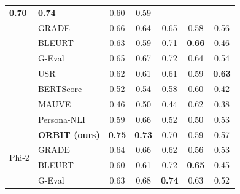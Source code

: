 \documentclass[11pt]{article}
\begin{document}
\begin{longtable}{llccccc}
\cellcolor{green!25}\textbf{0.70} &
\cellcolor{green!30}\textbf{0.74} &
\cellcolor{yellow!20}0.60 &
\cellcolor{yellow!25}0.59 \\
& GRADE &
\cellcolor{green!20}0.66 &
\cellcolor{green!15}0.64 &
\cellcolor{yellow!25}0.65 &
\cellcolor{yellow!20}0.58 &
\cellcolor{yellow!20}0.56 \\
& BLEURT &
\cellcolor{yellow!25}0.63 &
\cellcolor{yellow!25}0.59 &
\cellcolor{green!25}0.71 &
\cellcolor{green!15}\textbf{0.66} &
\cellcolor{red!10}0.46 \\
& G-Eval &
\cellcolor{green!15}0.65 &
\cellcolor{green!20}0.67 &
\cellcolor{green!25}0.72 &
\cellcolor{green!20}0.64 &
\cellcolor{yellow!20}0.54 \\
& USR &
\cellcolor{green!15}0.62 &
\cellcolor{green!15}0.61 &
\cellcolor{yellow!25}0.61 &
\cellcolor{yellow!20}0.59 &
\cellcolor{green!25}\textbf{0.63} \\
& BERTScore &
\cellcolor{red!15}0.52 &
\cellcolor{red!20}0.54 &
\cellcolor{yellow!20}0.58 &
\cellcolor{yellow!25}0.60 &
\cellcolor{red!20}0.42 \\
& MAUVE &
\cellcolor{red!30}0.46 &
\cellcolor{red!30}0.50 &
\cellcolor{red!30}0.44 &
\cellcolor{yellow!15}0.62 &
\cellcolor{red!30}0.38 \\
& Persona-NLI &
\cellcolor{yellow!20}0.59 &
\cellcolor{green!15}0.66 &
\cellcolor{red!20}0.52 &
\cellcolor{red!20}0.50 &
\cellcolor{yellow!25}0.53 \\
\midrule
\multirow{8}{*}{Phi-2} 
& \textbf{ORBIT (ours)} &
\cellcolor{green!35}\textbf{0.75} &
\cellcolor{green!30}\textbf{0.73} &
\cellcolor{green!25}0.70 &
\cellcolor{yellow!25}0.59 &
\cellcolor{yellow!30}0.57 \\

& GRADE &
\cellcolor{green!20}0.64 &
\cellcolor{green!20}0.66 &
\cellcolor{yellow!25}0.62 &
\cellcolor{yellow!20}0.56 &
\cellcolor{yellow!20}0.53 \\

& BLEURT &
\cellcolor{yellow!20}0.60 &
\cellcolor{yellow!25}0.61 &
\cellcolor{green!25}0.72 &
\cellcolor{green!15}\textbf{0.65} &
\cellcolor{red!10}0.45 \\

& G-Eval &
\cellcolor{green!15}0.63 &
\cellcolor{green!25}0.68 &
\cellcolor{green!25}\textbf{0.74} &
\cellcolor{green!20}0.63 &
\cellcolor{yellow!15}0.52 \\


\end{longtable}
\end{document}
